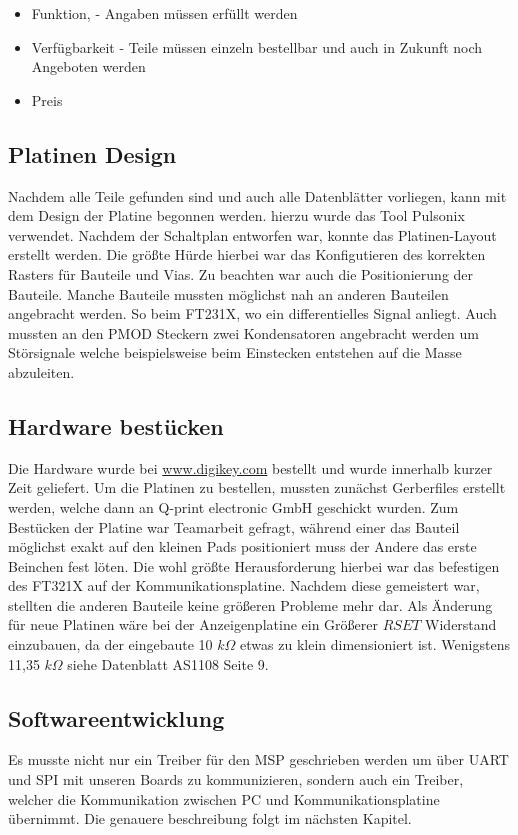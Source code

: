 \begin{itemize}
	\item Funktion, - Angaben müssen erfüllt werden
	\item Verfügbarkeit - Teile müssen einzeln bestellbar und auch in Zukunft noch Angeboten werden
	\item Preis
\end{itemize}

\subsection{Platinen Design}
Nachdem alle Teile gefunden sind und auch alle Datenblätter vorliegen, kann mit dem Design der Platine begonnen werden.
hierzu wurde das Tool Pulsonix verwendet. Nachdem der Schaltplan entworfen war, konnte das Platinen-Layout erstellt werden. Die größte Hürde hierbei war das Konfigutieren des korrekten Rasters für Bauteile und Vias.
Zu beachten war auch die Positionierung der Bauteile. Manche Bauteile mussten möglichst nah an anderen Bauteilen angebracht werden. So beim FT231X, wo ein differentielles Signal anliegt.
Auch mussten an den PMOD Steckern zwei Kondensatoren angebracht werden um Störsignale welche beispielsweise beim Einstecken entstehen auf die Masse abzuleiten.

\subsection{Hardware bestücken}
Die Hardware wurde bei \url{www.digikey.com} bestellt und wurde innerhalb kurzer Zeit geliefert. Um die Platinen zu bestellen, mussten zunächst Gerberfiles erstellt werden, welche dann an Q-print electronic GmbH geschickt wurden.
Zum Bestücken der Platine war Teamarbeit gefragt, während einer das Bauteil möglichst exakt auf den kleinen Pads positioniert muss der Andere das erste Beinchen fest löten. Die wohl größte Herausforderung hierbei war das befestigen des FT321X auf der Kommunikationsplatine. Nachdem diese  gemeistert war, stellten die anderen Bauteile keine größeren Probleme mehr dar.
Als Änderung für neue Platinen wäre bei der Anzeigenplatine ein Größerer $RSET$ Widerstand einzubauen, da der eingebaute 10 $k\Omega$ etwas zu klein dimensioniert ist. Wenigstens 11,35 $k\Omega$ siehe Datenblatt AS1108 Seite 9.

\subsection{Softwareentwicklung}
Es musste nicht nur ein Treiber für den MSP geschrieben werden um über UART und SPI mit unseren Boards zu kommunizieren, sondern auch ein Treiber, welcher die Kommunikation zwischen PC und Kommunikationsplatine übernimmt. Die genauere beschreibung folgt im nächsten Kapitel.

